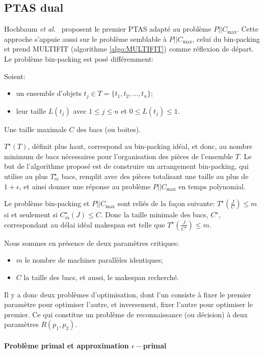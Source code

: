 \documentclass[a4paper,12pt]{report}
\theoremstyle{plain}				%
\theoremstyle{definition}				%
\newcommand\problemGrahamP{$P||C_{\max}$\xspace}
\begin{document}
\subsection{PTAS dual} \label{ssec:approximationPTAS} %

Hochbaum \emph{et al.}\ \cite{hochbaum1987using} proposent le
premier PTAS adapté au problème \problemGrahamP.
Cette approche s'appuie aussi sur le problème semblable à
\problemGrahamP, celui du bin-packing et prend MULTIFIT
(algorithme \ref{algo:MULTIFIT}) comme réflexion de départ.
Le problème bin-packing est posé différemment:

Soient:
\begin{itemize}
\item un ensemble d'objets $t_j \in T = \{t_1, t_2, ..., t_n\}$;
\item leur taille $L(t_j)$ avec $1 \le j \le n$ et $0 \le L(t_j) \le 1$.
\end{itemize}
Une taille maximale $C$ des bacs (ou boites).

$T^{\star}(T)$, définit plus haut, correspond au bin-packing idéal, et donc,
au nombre minimum de bacs nécessaires pour l'organisation des pièces
de l'ensemble $T$.
Le but de l'algorithme proposé est de construire un arrangement
bin-packing,
qui utilise au plus $T^{\star}_m$ bacs, remplit
avec des pièces totalisant une taille au plus de $1+ \epsilon$,
et ainsi donner une réponse au problème \problemGrahamP en temps polynomial.

Le problème bin-packing et \problemGrahamP sont reliés de la façon suivante:
$T^{\star}(\frac{J}{C}) \le m$ si et seulement si $C^{\star}_m(J) \le C$.
Donc la taille minimale des bacs, $C^{\star}$, correspondant au délai
idéal makespan est telle que $T^{\star}(\frac{J}{C^{\star}}) \le m$.

Nous sommes en présence de deux paramètres critiques:
\begin{itemize}
\item $m$ le nombre de machines parallèles identiques;
\item $C$ la taille des bacs, et aussi, le makespan recherché.
\end{itemize}
Il y a donc deux problèmes d'optimisation,
dont l'un consiste à fixer le premier paramètre pour optimiser l'autre,
et inversement, fixer l'autre pour optimiser le premier.
Ce qui constitue un problème de reconnaissance (ou décision) à deux
paramètres $R(p_1, p_2)$.

\paragraph{Problème primal et approximation $\epsilon-$primal}
\end{document}
